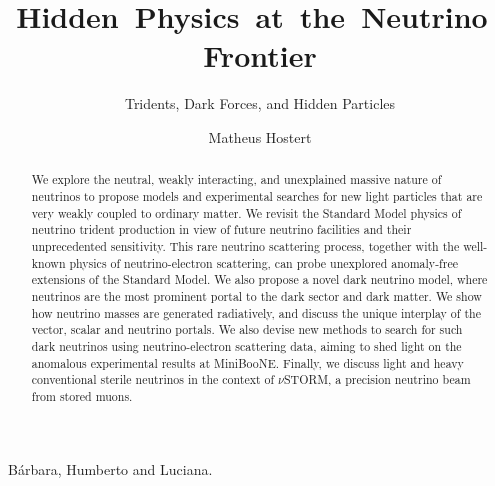 \documentclass[openany,twoside,frontopenright,openright]{ip3thesis}
\begin{document}
\title{Hidden~Physics~at~the~Neutrino~Frontier}
\subtitle{Tridents, Dark Forces, and Hidden Particles}
\author{Matheus Hostert}
\maketitlepage*

\begin{abstract}
%
We explore the neutral, weakly interacting, and unexplained massive nature of neutrinos to propose models and experimental searches for new light particles that are very weakly coupled to ordinary matter. We revisit the Standard Model physics of neutrino trident production in view of future neutrino facilities and their unprecedented sensitivity. This rare neutrino scattering process, together with the well-known physics of neutrino-electron scattering, can probe unexplored anomaly-free extensions of the Standard Model. We also propose a novel dark neutrino model, where neutrinos are the most prominent portal to the dark sector and dark matter. We show how neutrino masses are generated radiatively, and discuss the unique interplay of the vector, scalar and neutrino portals. We also devise new methods to search for such dark neutrinos using neutrino-electron scattering data, aiming to shed light on the anomalous experimental results at MiniBooNE. Finally, we discuss light and heavy conventional sterile neutrinos in the context of $\nu$STORM, a precision neutrino beam from stored muons.
%
\end{abstract}


\begin{dedication*}
%
B\'arbara, Humberto and Luciana.
%
\end{dedication*}

\disableprotrusion
\tableofcontents*
\listoffigures
\enableprotrusion
\end{document}
